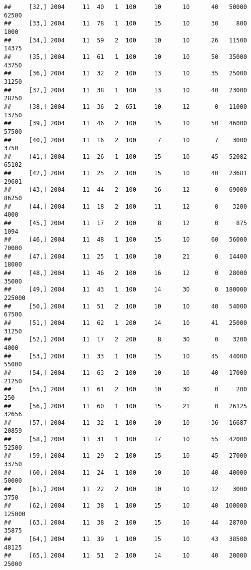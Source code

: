 \documentclass{article}\usepackage[]{graphicx}\usepackage[]{color}
\makeatletter
\newenvironment{kframe}{%
 \def\at@end@of@kframe{}%
 \ifinner\ifhmode%
  \def\at@end@of@kframe{\end{minipage}}%
  \begin{minipage}{\columnwidth}%
 \fi\fi%
 \def\FrameCommand##1{\hskip\@totalleftmargin \hskip-\fboxsep
 \colorbox{shadecolor}{##1}\hskip-\fboxsep
     \hskip-\linewidth \hskip-\@totalleftmargin \hskip\columnwidth}%
 \MakeFramed {\advance\hsize-\width
   \@totalleftmargin\z@ \linewidth\hsize
   \@setminipage}}%
 {\par\unskip\endMakeFramed%
 \at@end@of@kframe}
\newenvironment{knitrout}{}{} %
\makeatother
\begin{document}
\begin{knitrout}
\begin{kframe}
\begin{verbatim}
##     [32,] 2004     11  40   1  100     10      10      40   50000   62500
##     [33,] 2004     11  78   1  100     15      10      30     800    1000
##     [34,] 2004     11  59   2  100     10      10      26   11500   14375
##     [35,] 2004     11  61   1  100     10      10      50   35000   43750
##     [36,] 2004     11  32   2  100     13      10      35   25000   31250
##     [37,] 2004     11  38   1  100     13      10      40   23000   28750
##     [38,] 2004     11  36   2  651     10      12       0   11000   13750
##     [39,] 2004     11  46   2  100     15      10      50   46000   57500
##     [40,] 2004     11  16   2  100      7      10       7    3000    3750
##     [41,] 2004     11  26   1  100     15      10      45   52082   65102
##     [42,] 2004     11  25   2  100     15      10      40   23681   29601
##     [43,] 2004     11  44   2  100     16      12       0   69000   86250
##     [44,] 2004     11  18   2  100     11      12       0    3200    4000
##     [45,] 2004     11  17   2  100      8      12       0     875    1094
##     [46,] 2004     11  48   1  100     15      10      60   56000   70000
##     [47,] 2004     11  25   1  100     10      21       0   14400   18000
##     [48,] 2004     11  46   2  100     16      12       0   28000   35000
##     [49,] 2004     11  43   1  100     14      30       0  180000  225000
##     [50,] 2004     11  51   2  100     10      10      40   54000   67500
##     [51,] 2004     11  62   1  200     14      10      41   25000   31250
##     [52,] 2004     11  17   2  200      8      30       0    3200    4000
##     [53,] 2004     11  33   1  100     15      10      45   44000   55000
##     [54,] 2004     11  63   2  100     10      10      40   17000   21250
##     [55,] 2004     11  61   2  100     10      30       0     200     250
##     [56,] 2004     11  60   1  100     15      21       0   26125   32656
##     [57,] 2004     11  32   1  100     10      10      36   16687   20859
##     [58,] 2004     11  31   1  100     17      10      55   42000   52500
##     [59,] 2004     11  29   2  100     15      10      45   27000   33750
##     [60,] 2004     11  24   1  100     10      10      40   40000   50000
##     [61,] 2004     11  22   2  100     10      10      12    3000    3750
##     [62,] 2004     11  38   1  100     15      10      40  100000  125000
##     [63,] 2004     11  38   2  100     15      10      44   28700   35875
##     [64,] 2004     11  39   1  100     15      10      43   38500   48125
##     [65,] 2004     11  51   2  100     14      10      40   20000   25000

\end{verbatim}
\end{kframe}
\end{knitrout}
\end{document}
